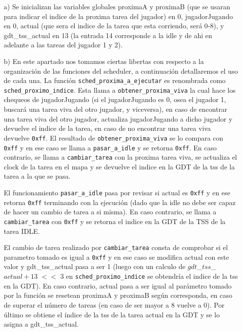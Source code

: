 \begin{enumerate}

\item[a)] Se inicializan las variables globales proximaA y proximaB (que se usaran para indicar el indice de la proxima tarea del jugador) en 0, jugadorJugando en 0, actual (que sera el indice de la tarea que esta corriendo, será 0-8), y gdt_tss_actual en 13 (la entrada 14 corresponde a la idle y de ahi en adelante a las tareas del jugador 1 y 2).

\item[b)] En este apartado nos tomamos ciertas libertas con respecto a la organización de las funciones del scheduler, a continuación detallaremos el uso de cada una. La función {\tt sched\_proxima\_a\_ejecutar} es renombrada como {\tt sched\_proximo\_indice}. Esta llama a {\tt obtener\_proxima\_viva} la cual hace los chequeos de jugadorJugando (si el jugadorJugando es 0, osea el jugador 1, buscará una tarea viva del otro jugador, y viceversa), en caso de encontrar una tarea viva del otro jugador, actualiza jugadorJugando a dicho jugador y devuelve el indice de la tarea, en caso de no encontrar una tarea viva devuelve {\tt 0xff}. El resultado de {\tt obtener\_proxima\_viva} se lo compara con {\tt 0xff} y en ese caso se llama a {\tt pasar\_a\_idle} y se retorna {\tt 0xff}. En caso contrario, se llama a {\tt cambiar\_tarea} con la proxima tarea viva, se actualiza el clock de la tarea en el mapa y se devuelve el indice en la GDT de la tss de la tarea a la que se pasa.

El funcionamiento {\tt pasar\_a\_idle} pasa por revisar si actual es {\tt 0xff} y en ese retorna  {\tt 0xff} terminando con la ejecución (dado que la idle no debe ser capaz de hacer un cambio de tarea a si misma). En caso contrario, se llama a {\tt cambiar\_tarea} con {\tt 0xff} y se retorna el indice en la GDT de la TSS de la tarea IDLE.

El cambio de tarea realizado por {\tt cambiar\_tarea} consta de comprobar si el parametro tomado es igual a {\tt 0xff} y en ese caso se modifica actual con este valor y gdt_tss_actual pasa a ser 1 (luego con un calculo de $gdt$_$tss$_$actual + 13$ $<<$ 3 en {\tt sched\_proximo\_indice} se obtendría el indice de la tss en la GDT). En caso contrario, actual pasa a ser igual al parámetro tomado por la función se resetean proximaA y proximaB según corresponda, en caso de superar el número de tareas (en caso de ser mayor a 8 vuelve a 0). Por último se obtiene el índice de la tss de la tarea actual en la GDT y se lo asigna a gdt_tss_actual.


\end{enumerate}
